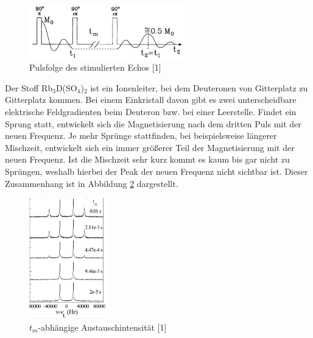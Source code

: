 \begin{figure}[H]
 \includegraphics[width=0.6\textwidth]{../pics/stimEchoFolge.jpg}
 \caption{Pulsfolge des stimulierten Echos [1]}
 \label{pic_stimEchoFolge}
\end{figure}
\noindent
Der Stoff Rb$_3$D(SO$_4$)$_2$ ist ein Ionenleiter, bei dem Deuteronen von Gitterplatz zu Gitterplatz kommen. Bei einem Einkristall davon gibt es zwei
unterscheidbare elektrische Feldgradienten beim Deuteron bzw. bei einer Leerstelle. Findet ein Sprung statt, entwickelt sich die Magnetisierung nach dem 
dritten Puls mit der
neuen Frequenz. Je mehr Sprünge stattfinden, bei beispielsweise längerer Mischzeit, entwickelt sich ein immer größerer Teil der Magnetisierung mit der 
neuen Frequenz. Ist die Mischzeit sehr kurz kommt es kaum bis gar nicht zu Sprüngen, weshalb hierbei der Peak der neuen Frequenz nicht sichtbar ist.
Dieser Zusammenhang ist in Abbildung \ref{pic_neueFrequenz} dargestellt. 
\begin{figure}[H]
 \includegraphics[width=0.3\textwidth]{../pics/neueFrequenz.jpg}
 \caption{$t_m$-abhängige Austauschintensität [1]}
 \label{pic_neueFrequenz}
\end{figure}
